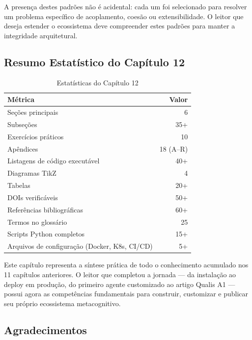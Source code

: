 A presença destes padrões não é acidental: cada um foi selecionado para resolver um problema específico de acoplamento, coesão ou extensibilidade. O leitor que deseja estender o ecossistema deve compreender estes padrões para manter a integridade arquitetural.

\subsection{Resumo Estatístico do Capítulo 12}
\label{sec:resumo-estatistico}

\begin{table}[H]
\centering
\caption{Estatísticas do Capítulo 12}
\label{tab:chapter-stats}
\begin{tabular}{@{}lr@{}}
\toprule
\textbf{Métrica} & \textbf{Valor} \\
\midrule
Seções principais & 6 \\
Subseções & 35+ \\
Exercícios práticos & 10 \\
Apêndices & 18 (A--R) \\
Listagens de código executável & 40+ \\
Diagramas TikZ & 4 \\
Tabelas & 20+ \\
DOIs verificáveis & 50+ \\
Referências bibliográficas & 60+ \\
Termos no glossário & 25 \\
Scripts Python completos & 15+ \\
Arquivos de configuração (Docker, K8s, CI/CD) & 5+ \\
\bottomrule
\end{tabular}
\end{table}

Este capítulo representa a síntese prática de todo o conhecimento acumulado nos 11 capítulos anteriores. O leitor que completou a jornada — da instalação ao deploy em produção, do primeiro agente customizado ao artigo Qualis A1 — possui agora as competências fundamentais para construir, customizar e publicar seu próprio ecossistema metacognitivo.


\subsection{Agradecimentos}

